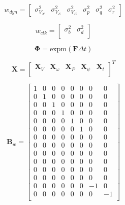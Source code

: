 \begin{equation}\label{eq:wDyn}
    w_{dyn} = \begin{bmatrix}
        \sigma^2_{V_N} & \sigma^2_{V_E} & \sigma^2_{V_E} & \sigma^2_{p} & \sigma^2_{q} & \sigma^2_{r}
    \end{bmatrix}
\end{equation}

\begin{equation}\label{eq:wClk}
    w_{clk} = \begin{bmatrix}
        \sigma^2_b & \sigma^2_d \\
    \end{bmatrix}
\end{equation}

\begin{equation}\label{eq:Phi}
    \mathbf{\Phi} = \textrm{expm}(\mathbf{F}\Delta t)
\end{equation}

\begin{equation}\label{eq:stateVector}
    \mathbf{X} =
    \begin{bmatrix}
        \mathbf{X}_V & \mathbf{X}_{\omega} & \mathbf{X}_P & \mathbf{X}_{\psi} & \mathbf{X}_t \\
    \end{bmatrix}^T
\end{equation}

\begin{equation}\label{eq:Bw}
    \mathbf{B}_w =\begin{bmatrix}
        1 & 0 & 0 & 0 & 0 & 0 & 0  & 0  \\
        0 & 1 & 0 & 0 & 0 & 0 & 0  & 0  \\
        0 & 0 & 1 & 0 & 0 & 0 & 0  & 0  \\
        0 & 0 & 0 & 1 & 0 & 0 & 0  & 0  \\
        0 & 0 & 0 & 0 & 1 & 0 & 0  & 0  \\
        0 & 0 & 0 & 0 & 0 & 1 & 0  & 0  \\
        0 & 0 & 0 & 0 & 0 & 0 & 0  & 0  \\
        0 & 0 & 0 & 0 & 0 & 0 & 0  & 0  \\
        0 & 0 & 0 & 0 & 0 & 0 & 0  & 0  \\
        0 & 0 & 0 & 0 & 0 & 0 & 0  & 0  \\
        0 & 0 & 0 & 0 & 0 & 0 & 0  & 0  \\
        0 & 0 & 0 & 0 & 0 & 0 & 0  & 0  \\
        0 & 0 & 0 & 0 & 0 & 0 & -1 & 0  \\
        0 & 0 & 0 & 0 & 0 & 0 & 0  & -1 \\
    \end{bmatrix}
\end{equation}

